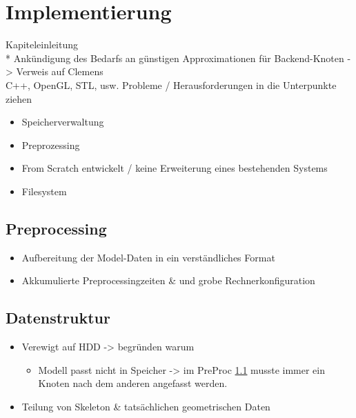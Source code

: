 
\chapter{Implementierung}
\label{chap:impl}
Kapiteleinleitung\\*
Ankündigung des Bedarfs an günstigen Approximationen für Backend-Knoten -> Verweis auf Clemens\\
C++, OpenGL, STL, usw.
Probleme / Herausforderungen in die Unterpunkte ziehen
\begin{itemize}
 \item Speicherverwaltung
 \item Preprozessing
 \item From Scratch entwickelt / keine Erweiterung eines bestehenden Systems
 \item Filesystem
\end{itemize}

\section{Preprocessing}
\label{sec:impl:preprocessing}
%
\begin{itemize}
 \item Aufbereitung der Model-Daten in ein verständliches Format
 \item Akkumulierte Preprocessingzeiten \& und grobe Rechnerkonfiguration
\end{itemize}

\section{Datenstruktur}
\label{sec:impl:datenstruktur}
%
\begin{itemize}
 \item Verewigt auf HDD -> begründen warum
 \begin{itemize}
  \item Modell passt nicht in Speicher -> im PreProc \ref{sec:impl:preprocessing} musste immer ein Knoten nach dem anderen angefasst werden.
 \end{itemize}

 \item Teilung von Skeleton \& tatsächlichen geometrischen Daten
\end{itemize}


